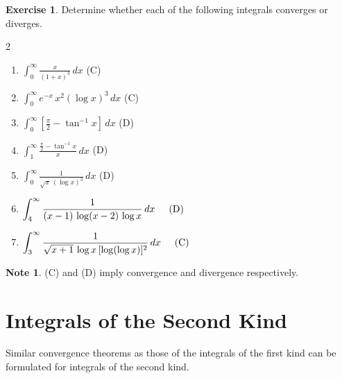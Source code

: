 \documentclass[12pt,a4paper]{report}
\theoremstyle{definition}
\newtheorem{exe}[thm]{Exercise}
\newtheorem{note}[thm]{Note}
\theoremstyle{plain}
\begin{document}
\begin{exe}
Determine whether each of the following integrals converges or diverges.
\begin{multicols}{2}
\begin{enumerate}
\item[(a).] $\displaystyle{\int_0^{\infty} \frac{x}{(1 + x)^3}\, dx}$ \hspace{0.5cm} (C)\\
\item[(b).] $\displaystyle{\int_0^{\infty}e^{-x}\, x^2 (\log x)^3}\, dx$\hspace{0.5cm} (C)\\
\item[(c).] $\displaystyle{\int_0^{\infty} \left[\frac{\pi}{2} - \tan^{-1}x\right]}\, dx$ \hspace{0.5cm} (D)\\
\item[(d).] $\displaystyle{\int_1^{\infty} \frac{\frac{\pi}{2} - \tan^{-1} x}{x}}\, dx$ \hspace{0.5cm} (D)\\
\item[(e).] $\displaystyle{\int_0^{\infty} \frac{1}{\sqrt{x}\, (\log x)^3}}\, dx$ \hspace{0.5cm} (D)\\
\item[(f).] $\displaystyle{\int_4^{\infty} \frac{1}{(x - 1)\, \log(x - 2)\, \log x}}\, dx \hspace{0.5cm} \text{(D)}$
\item[(g).] $\displaystyle{\int_3^{\infty} \frac{1}{\sqrt{x + 1}\, \log x\, [\log(\log x)]^2}}\, dx\hspace{0.5cm}\text{(C)}$ 
\end{enumerate}
\end{multicols}
\begin{note}
(C) and (D) imply convergence and divergence respectively.
\end{note}
\end{exe}





\section{Integrals of the Second Kind}
\vspace*{-5mm}
Similar convergence theorems as those of the integrals of the first kind can be formulated for integrals of the second kind.
\end{document}

